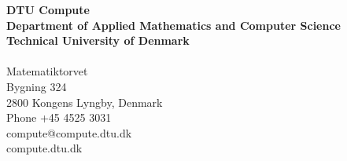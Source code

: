 \thispagestyle{empty} %
\vspace*{\fill}
\noindent
\sffamily
\scriptsize
\textbf{DTU Compute}\\
\textbf{Department of Applied Mathematics and Computer Science}\\
\textbf{Technical University of Denmark}\\
\\
Matematiktorvet\\
Bygning 324\\
2800 Kongens Lyngby, Denmark\\
Phone +45 4525 3031\\
compute@compute.dtu.dk\\
compute.dtu.dk\\
\normalsize
\normalfont
\vspace*{2.5cm}

